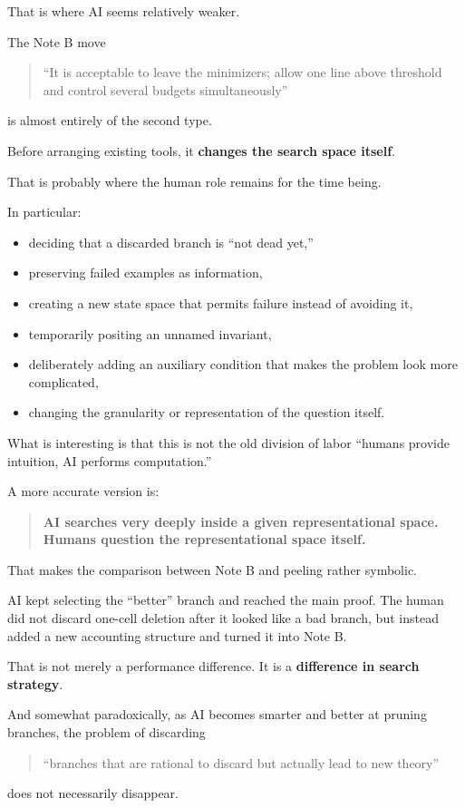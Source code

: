 \documentclass[11pt,a4paper]{article}
\begin{document}
That is where AI seems relatively weaker.

The Note B move
\begin{quote}
“It is acceptable to leave the minimizers; allow one line above threshold and control several budgets simultaneously”
\end{quote}
is almost entirely of the second type.

Before arranging existing tools, it \textbf{changes the search space itself}.

That is probably where the human role remains for the time being.

In particular:
\begin{itemize}[leftmargin=2em]
\item deciding that a discarded branch is “not dead yet,”
\item preserving failed examples as information,
\item creating a new state space that permits failure instead of avoiding it,
\item temporarily positing an unnamed invariant,
\item deliberately adding an auxiliary condition that makes the problem look more complicated,
\item changing the granularity or representation of the question itself.
\end{itemize}

What is interesting is that this is not the old division of labor “humans provide intuition, AI performs computation.”

A more accurate version is:
\begin{quote}
\textbf{AI searches very deeply inside a given representational space.  
Humans question the representational space itself.}
\end{quote}

That makes the comparison between Note B and peeling rather symbolic.

AI kept selecting the “better” branch and reached the main proof. The human did not discard one-cell deletion after it looked like a bad branch, but instead added a new accounting structure and turned it into Note B.

That is not merely a performance difference. It is a \textbf{difference in search strategy}.

And somewhat paradoxically, as AI becomes smarter and better at pruning branches, the problem of discarding
\begin{quote}
“branches that are rational to discard but actually lead to new theory”
\end{quote}
does not necessarily disappear.
\end{document}
